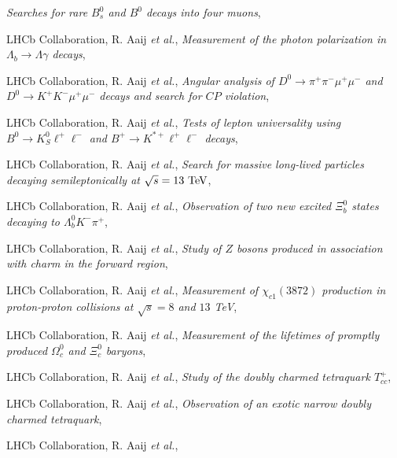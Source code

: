 \begin{cvcontent}
\begin{enumerate}[label={[\arabic*]}, leftmargin=1.5cm]
    \emph{Searches for rare $B_s^0$ and $B^0$ decays into four muons},
    \item LHCb Collaboration, R. Aaij \emph{et al.}, 
    \emph{Measurement of the photon polarization in $\Lambda_b \to \Lambda \gamma$ decays},
    \sloppy
    \item LHCb Collaboration, R. Aaij \emph{et al.}, 
    \emph{Angular analysis of $D^0 \to \pi^+\pi^-\mu^+\mu^-$ and $D^0 \to K^+K^-\mu^+\mu^-$ decays and search for $CP$ violation},
    \item LHCb Collaboration, R. Aaij \emph{et al.}, 
    \emph{Tests of lepton universality using $B^0\to K^0_S \ell^+ \ell^-$ and $B^+\to K^{*+}\ell^+\ell^-$ decays},
    \item LHCb Collaboration, R. Aaij \emph{et al.}, 
    \emph{Search for massive long-lived particles decaying semileptonically at $\sqrt{s} = 13~\rm{TeV}$},
    \item LHCb Collaboration, R. Aaij \emph{et al.}, 
    \emph{Observation of two new excited $\Xi_b^0$ states decaying to  $\Lambda_b^0 K^- \pi^+$}, 
    \item LHCb Collaboration, R. Aaij \emph{et al.}, 
    \emph{Study of $Z$ bosons produced in association with charm in the forward region}, 
    \item LHCb Collaboration, R. Aaij \emph{et al.}, 
    \emph{Measurement of $\chi_{c1}(3872)$ production in proton-proton collisions at $\sqrt{s}=8$ and $13$ TeV}, 
    \item LHCb Collaboration, R. Aaij \emph{et al.}, 
    \emph{Measurement of the lifetimes of promptly produced $\Omega^{0}_{c}$ and $\Xi^{0}_{c}$ baryons},
    \sloppy
    \item LHCb Collaboration, R. Aaij \emph{et al.}, 
    \emph{Study of the doubly charmed tetraquark $T_{cc}^+$}, 
    \item LHCb Collaboration, R. Aaij \emph{et al.}, 
    \emph{Observation of an exotic narrow doubly charmed tetraquark}, 
  \end{enumerate}
  \begin{enumerate}[label={[\arabic*]}, leftmargin=1.5cm]
    \item LHCb Collaboration, R. Aaij \emph{et al.}, 

\end{enumerate}
\end{cvcontent}
